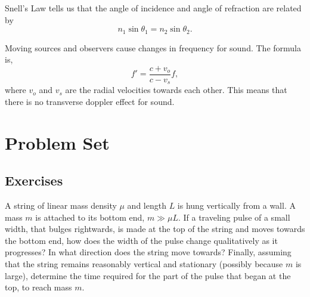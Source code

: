 \documentclass[11pt]{scrartcl}
\begin{document}
\begin{theorem}
    Snell's Law tells us that the angle of incidence and angle of refraction are related by
    $$n_1 \sin \theta_1 = n_2 \sin \theta_2.$$
\end{theorem}

\begin{theorem}
    Moving sources and observers cause changes in frequency for sound. The formula is,
    $$f' = \frac{c+v_o}{c-v_s}f,$$
    where $v_o$ and $v_s$ are the radial velocities towards each other. This means that there is no transverse doppler effect for sound.
\end{theorem}


\section{Problem Set}

\subsection{Exercises}

\begin{prob}[Wang]
    A string of linear mass density $\mu$ and length $L$ is hung vertically from a wall. A mass $m$ is attached to its bottom end, $m \gg \mu L$. If a traveling
pulse of a small width, that bulges rightwards, is made at the top of the
string and moves towards the bottom end, how does the width of the pulse
change qualitatively as it progresses? In what direction does the string move
towards? Finally, assuming that the string remains reasonably vertical and
stationary (possibly because $m$ is large), determine the time required for the
part of the pulse that began at the top, to reach mass $m$.
\end{prob}

\end{document}
